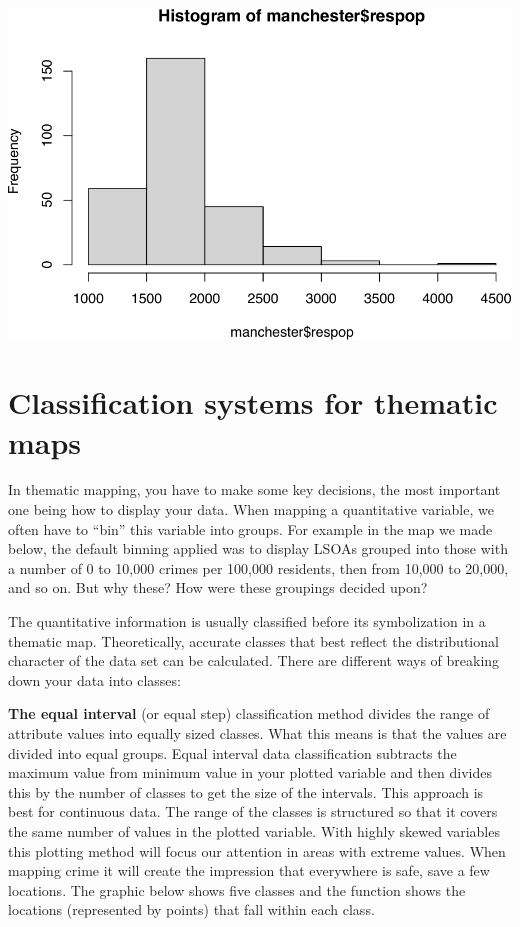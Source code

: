 \documentclass[
]{book}
\begin{document}
\includegraphics{crime_mapping_files/figure-latex/unnamed-chunk-81-1.pdf}

\hypertarget{classification-systems-for-thematic-maps}{%
\section{Classification systems for thematic maps}\label{classification-systems-for-thematic-maps}}

In thematic mapping, you have to make some key decisions, the most important one being how to display your data. When mapping a quantitative variable, we often have to ``bin'' this variable into groups. For example in the map we made below, the default binning applied was to display LSOAs grouped into those with a number of 0 to 10,000 crimes per 100,000 residents, then from 10,000 to 20,000, and so on. But why these? How were these groupings decided upon?

The quantitative information is usually classified before its symbolization in a thematic map. Theoretically, accurate classes that best reflect the distributional character of the data set can be calculated. There are different ways of breaking down your data into classes:

\textbf{The equal interval} (or equal step) classification method divides the range of attribute values into equally sized classes. What this means is that the values are divided into equal groups. Equal interval data classification subtracts the maximum value from minimum value in your plotted variable and then divides this by the number of classes to get the size of the intervals. This approach is best for continuous data. The range of the classes is structured so that it covers the same number of values in the plotted variable. With highly skewed variables this plotting method will focus our attention in areas with extreme values. When mapping crime it will create the impression that everywhere is safe, save a few locations. The graphic below shows five classes and the function shows the locations (represented by points) that fall within each class.
\end{document}
